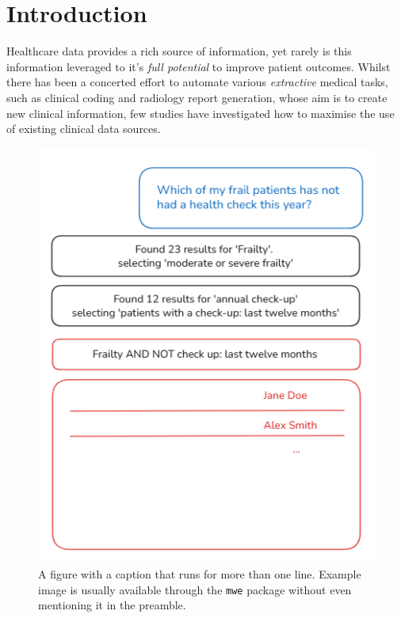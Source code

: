 \documentclass[11pt]{article}
\begin{document}
\section{Introduction}
Healthcare data provides a rich source of information, yet rarely is this information leveraged to it's \textit{full potential} to improve
patient outcomes. Whilst there has been a concerted effort to automate various \textit{extractive} medical tasks, such as clinical coding
and radiology report generation, whose aim is to create new clinical information, few studies have investigated how to maximise the use of
existing clinical data sources.

\begin{figure}[t]
  \includegraphics[width=\columnwidth]{content/chat_diagram.PNG}
  \caption{A figure with a caption that runs for more than one line.
    Example image is usually available through the \texttt{mwe} package
    without even mentioning it in the preamble.}
  \label{fig:experiments}
\end{figure}
\end{document}
